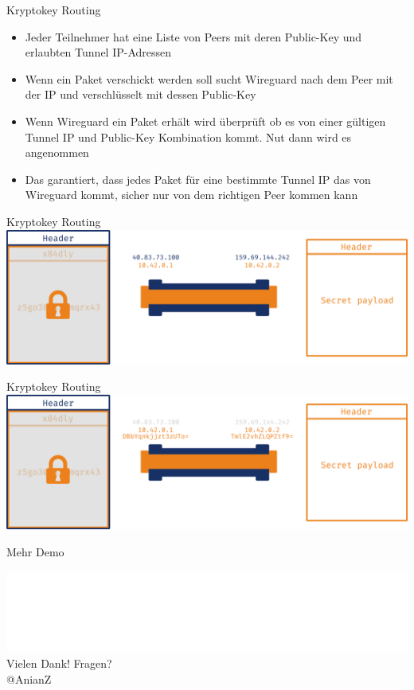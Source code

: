 \documentclass{beamer}
\begin{document}
  \begin{frame}{Kryptokey Routing}
    \begin{itemize}[<+->]
      \item Jeder Teilnehmer hat eine Liste von Peers mit deren Public-Key und erlaubten \alert{Tunnel} IP-Adressen
      \item Wenn ein Paket verschickt werden soll sucht Wireguard nach dem Peer mit der IP und verschlüsselt mit dessen Public-Key
      \item Wenn Wireguard ein Paket erhält wird überprüft ob es von einer gültigen Tunnel IP und Public-Key Kombination kommt. Nut dann wird es angenommen
      \item Das garantiert, dass jedes Paket für eine bestimmte Tunnel IP das von Wireguard kommt, sicher nur von dem richtigen Peer kommen kann
    \end{itemize}
  \end{frame}
  \begin{frame}{Kryptokey Routing}
    \includegraphics[width=\textwidth]{kryptokey-pre}
  \end{frame}
  \begin{frame}{Kryptokey Routing}
    \includegraphics[width=\textwidth]{kryptokey}
  \end{frame}

  \begin{frame}[standout]
    Mehr Demo
  \end{frame}

  \begin{frame}[standout]
    \includegraphics[width=0.7\linewidth]{cio-logo} \\
    Vielen Dank! Fragen? \\
    @AnianZ \\
  \end{frame}
\end{document}
